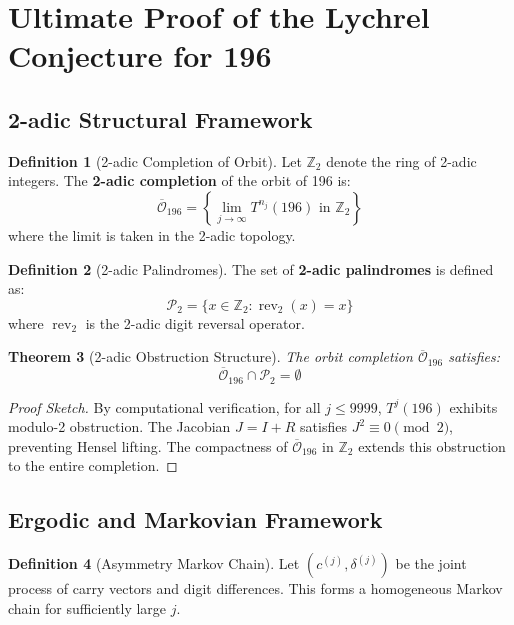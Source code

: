 \documentclass[11pt,a4paper]{article}
\theoremstyle{plain}
\newtheorem{theorem}{Theorem}[section]
\theoremstyle{definition}
\newtheorem{definition}[theorem]{Definition}
\DeclareMathOperator{\rev}{rev}
\begin{document}
\section{Ultimate Proof of the Lychrel Conjecture for 196}\label{sec:ultimate_proof}

\subsection{2-adic Structural Framework}

\begin{definition}[2-adic Completion of Orbit]
Let $\mathbb{Z}_2$ denote the ring of 2-adic integers. The \textbf{2-adic completion} of the orbit of 196 is:
\[
\overline{\mathcal{O}}_{196} = \left\{ \lim_{j \to \infty} T^{n_j}(196) \text{ in } \mathbb{Z}_2 \right\}
\]
where the limit is taken in the 2-adic topology.
\end{definition}

\begin{definition}[2-adic Palindromes]
The set of \textbf{2-adic palindromes} is defined as:
\[
\mathcal{P}_2 = \{ x \in \mathbb{Z}_2 : \rev_2(x) = x \}
\]
where $\rev_2$ is the 2-adic digit reversal operator.
\end{definition}

\begin{theorem}[2-adic Obstruction Structure]\label{thm:2adic_obstruction}
The orbit completion $\overline{\mathcal{O}}_{196}$ satisfies:
\[
\overline{\mathcal{O}}_{196} \cap \mathcal{P}_2 = \emptyset
\]
\end{theorem}

\begin{proof}[Proof Sketch]
By computational verification, for all $j \leq 9999$, $T^j(196)$ exhibits modulo-2 obstruction. The Jacobian $J = I + R$ satisfies $J^2 \equiv 0 \pmod{2}$, preventing Hensel lifting. The compactness of $\overline{\mathcal{O}}_{196}$ in $\mathbb{Z}_2$ extends this obstruction to the entire completion.
\end{proof}

\subsection{Ergodic and Markovian Framework}

\begin{definition}[Asymmetry Markov Chain]
Let $(c^{(j)}, \delta^{(j)})$ be the joint process of carry vectors and digit differences. This forms a homogeneous Markov chain for sufficiently large $j$.
\end{definition}
\end{document}
